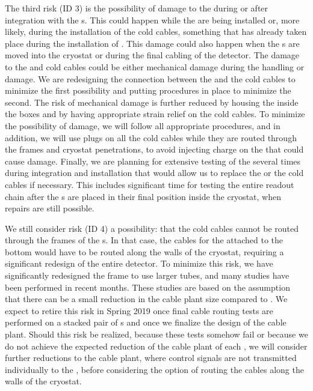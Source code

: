 The third risk (ID 3) is the possibility of damage to the 
 during or after integration with the s. This could
happen while the  are being installed or, more likely, during the
installation of the cold cables, something that has already taken place during
the installation of . This damage could also happen when the s are
moved into the cryostat or during the final cabling of the detector. The damage
to the  and cold cables could be either mechanical damage during the
handling or  damage. We are redesigning the connection between the 
and the cold cables to minimize the first possibility and putting procedures in place
to minimize the second. The risk of mechanical damage
is further reduced by housing the  inside the  boxes and by having 
appropriate strain relief on the cold cables. To minimize the possibility of
 damage, we will follow all appropriate procedures, and in addition,
we will use plugs on all the cold cables while they are routed through the
 frames and cryostat penetrations, to avoid injecting charge on
the  that could cause  damage. Finally, we are planning for
extensive testing of the  several times during integration
and installation that would allow us to replace the 
or the cold cables if necessary. This includes significant time for testing the entire readout 
chain after the s are placed in their final position inside the cryostat,
when repairs are still possible.

We still consider risk (ID 4) a possibility: that the cold cables cannot
be routed through the frames of the s. In that case, the cables for the
 attached to the bottom  would have to be routed along the
walls of the cryostat, requiring a significant redesign of the entire detector. 
To minimize this risk, we have significantly redesigned the  frame 
to use larger tubes, and many studies have been performed in recent months.
These studies are based on the assumption that there can be a small reduction in
the cable plant size compared to . We expect to retire this risk
in Spring 2019 once final cable routing tests are performed on
a stacked pair of s and once we finalize the design of the
 cable plant. Should
this risk be realized, because these tests somehow fail or because we do not 
achieve the expected reduction of the cable plant of each , we will 
consider further reductions to the cable plant, where control signals are not
transmitted individually to the , before considering the option of 
routing the cables along the walls of the cryostat.


